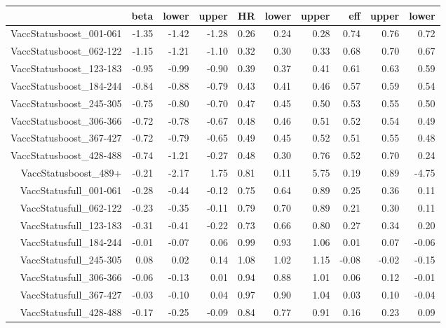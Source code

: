 \begin{table}[ht]
\centering
\begin{tabular}{rrrrrrrrrr}
  \hline
 & beta & lower & upper & HR & lower & upper & eff & upper & lower \\ 
  \hline
VaccStatusboost\_001-061 & -1.35 & -1.42 & -1.28 & 0.26 & 0.24 & 0.28 & 0.74 & 0.76 & 0.72 \\ 
  VaccStatusboost\_062-122 & -1.15 & -1.21 & -1.10 & 0.32 & 0.30 & 0.33 & 0.68 & 0.70 & 0.67 \\ 
  VaccStatusboost\_123-183 & -0.95 & -0.99 & -0.90 & 0.39 & 0.37 & 0.41 & 0.61 & 0.63 & 0.59 \\ 
  VaccStatusboost\_184-244 & -0.84 & -0.88 & -0.79 & 0.43 & 0.41 & 0.46 & 0.57 & 0.59 & 0.54 \\ 
  VaccStatusboost\_245-305 & -0.75 & -0.80 & -0.70 & 0.47 & 0.45 & 0.50 & 0.53 & 0.55 & 0.50 \\ 
  VaccStatusboost\_306-366 & -0.72 & -0.78 & -0.67 & 0.48 & 0.46 & 0.51 & 0.52 & 0.54 & 0.49 \\ 
  VaccStatusboost\_367-427 & -0.72 & -0.79 & -0.65 & 0.49 & 0.45 & 0.52 & 0.51 & 0.55 & 0.48 \\ 
  VaccStatusboost\_428-488 & -0.74 & -1.21 & -0.27 & 0.48 & 0.30 & 0.76 & 0.52 & 0.70 & 0.24 \\ 
  VaccStatusboost\_489+ & -0.21 & -2.17 & 1.75 & 0.81 & 0.11 & 5.75 & 0.19 & 0.89 & -4.75 \\ 
  VaccStatusfull\_001-061 & -0.28 & -0.44 & -0.12 & 0.75 & 0.64 & 0.89 & 0.25 & 0.36 & 0.11 \\ 
  VaccStatusfull\_062-122 & -0.23 & -0.35 & -0.11 & 0.79 & 0.70 & 0.89 & 0.21 & 0.30 & 0.11 \\ 
  VaccStatusfull\_123-183 & -0.31 & -0.41 & -0.22 & 0.73 & 0.66 & 0.80 & 0.27 & 0.34 & 0.20 \\ 
  VaccStatusfull\_184-244 & -0.01 & -0.07 & 0.06 & 0.99 & 0.93 & 1.06 & 0.01 & 0.07 & -0.06 \\ 
  VaccStatusfull\_245-305 & 0.08 & 0.02 & 0.14 & 1.08 & 1.02 & 1.15 & -0.08 & -0.02 & -0.15 \\ 
  VaccStatusfull\_306-366 & -0.06 & -0.13 & 0.01 & 0.94 & 0.88 & 1.01 & 0.06 & 0.12 & -0.01 \\ 
  VaccStatusfull\_367-427 & -0.03 & -0.10 & 0.04 & 0.97 & 0.90 & 1.04 & 0.03 & 0.10 & -0.04 \\ 
  VaccStatusfull\_428-488 & -0.17 & -0.25 & -0.09 & 0.84 & 0.77 & 0.91 & 0.16 & 0.23 & 0.09 \\ 

\end{tabular}
\end{table}
